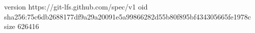 version https://git-lfs.github.com/spec/v1
oid sha256:75c6db2688177df9a29a20091e5a99866282d55b80f895bf434305665fe1978c
size 626416
